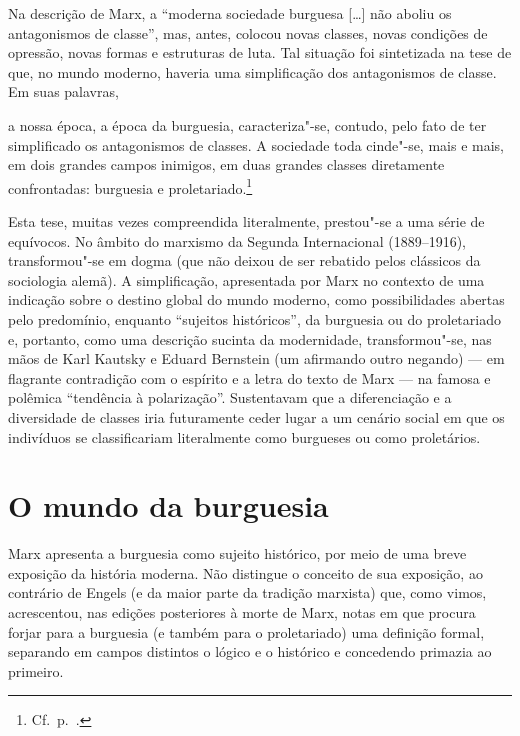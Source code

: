 Na descrição de Marx, a “moderna sociedade burguesa [\ldots{}] não aboliu os
antagonismos de classe”, mas, antes, colocou novas classes, novas
condições de opressão, novas formas e estruturas de luta. Tal situação
foi sintetizada na tese de que, no mundo moderno, haveria uma
simplificação dos antagonismos de classe. Em suas palavras, 

\begin{hedraquote} 
a nossa época, a época da burguesia, caracteriza"-se, contudo, pelo
fato de ter simplificado os antagonismos de classes. A sociedade toda
cinde"-se, mais e mais, em dois grandes campos inimigos, em duas
grandes classes diretamente confrontadas: burguesia e proletariado.\footnote{ Cf.~p.~\pageref{1}.}
\end{hedraquote} 

Esta tese, muitas vezes compreendida literalmente, prestou"-se a uma
série de equívocos. No âmbito do marxismo da Segunda Internacional (1889--1916),
transformou"-se em dogma (que não deixou de ser rebatido pelos
clássicos da sociologia alemã). A simplificação, apresentada por Marx
no contexto de uma indicação sobre o destino global do mundo moderno,
como possibilidades abertas pelo predomínio, enquanto “sujeitos
históricos”, da burguesia ou do proletariado e, portanto, como uma
descrição sucinta da modernidade, transformou"-se, nas mãos de Karl
Kautsky e Eduard Bernstein (um afirmando outro negando) --- em flagrante
contradição com o espírito e a letra do texto de Marx --- na famosa e
polêmica “tendência à polarização”. Sustentavam que a diferenciação e a
diversidade de classes iria futuramente ceder lugar a um cenário social
em que os indivíduos se classificariam literalmente como burgueses
ou como proletários.

\section*{O mundo da burguesia}

Marx apresenta a burguesia como sujeito histórico, por meio de uma breve
exposição da história moderna. Não distingue o conceito de sua
exposição, ao contrário de Engels (e da maior parte da tradição
marxista) que, como vimos, acrescentou, nas edições posteriores à morte
de Marx, notas em que procura forjar para a burguesia (e também para o
proletariado) uma definição formal, separando em campos distintos o
lógico e o histórico e concedendo primazia ao primeiro.

